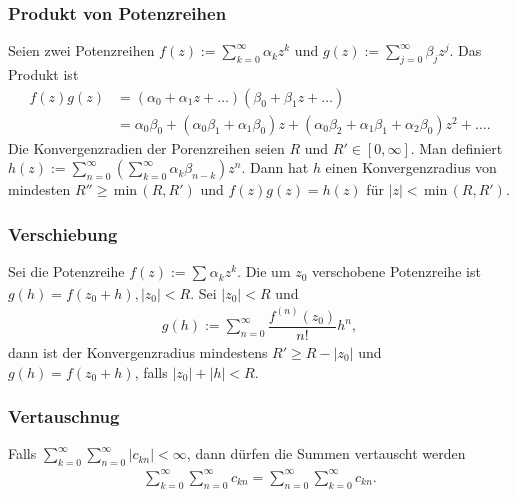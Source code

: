 \documentclass[a4paper,12pt]{article}
\numberwithin{equation}{section}
\begin{document}
\subsubsection{Produkt von Potenzreihen}
Seien zwei Potenzreihen $f\left(z\right):=\sum_{k=0}^{\infty}\alpha _kz^k$ und $g\left(z\right):=\sum_{j=0}^{\infty}\beta _jz^j$. Das Produkt ist
\begin{align} 
        f\left(z\right)g\left(z\right)&=\left(\alpha _0+\alpha _1z+\hdots \right)\left(\beta _0+\beta _1z+\hdots \right)\\
                                      &=\alpha _0\beta _0+\left(\alpha _0\beta _1+\alpha _1\beta _0\right)z+\left(\alpha _0\beta _2+\alpha _1\beta _1+\alpha _2\beta _0\right)z^2+\hdots 
.\end{align} 
Die Konvergenzradien der Porenzreihen seien $R$ und $R' \in \left[0,\infty\right]$. Man definiert $h\left(z\right):=\sum_{n=0}^{\infty}\left(\sum_{k=0}^{\infty}\alpha _k\beta _{n-k}\right)z^n$. Dann hat $h$ einen Konvergenzradius von mindesten $R''\geq \,\text{min}\,\left(R,R'\right)$ und $f\left(z\right)g\left(z\right)=h\left(z\right)$ für $|z|<\,\text{min}\,\left(R,R'\right)$.

\subsubsection{Verschiebung}
Sei die Potenzreihe $f\left(z\right):=\sum_{}^{}\alpha _kz^k$. Die um $z_0$ verschobene Potenzreihe ist $g\left(h\right)=f\left(z_0+h\right),|z_0|<R$. Sei $|z_0|<R$ und 
\begin{align} 
        g\left(h\right):=\sum_{n=0}^{\infty}\dfrac{f^{\left(n\right)}\left(z_0\right)}{n!}h^n
,\end{align} 
dann ist der Konvergenzradius mindestens $R'\geq R-|z_0|$ und $g\left(h\right)=f\left(z_0+h\right)$, falls $|z_0|+|h|<R$.

\subsubsection{Vertauschnug}
Falls $\sum_{k=0}^{\infty}\sum_{n=0}^{\infty}|c _{kn}|<\infty$, dann dürfen die Summen vertauscht werden
\begin{align} 
        \sum_{k=0}^{\infty}\sum_{n=0}^{\infty}c _{kn}=\sum_{n=0}^{\infty}\sum_{k=0}^{\infty}c _{kn}
.\end{align} 
\end{document}
